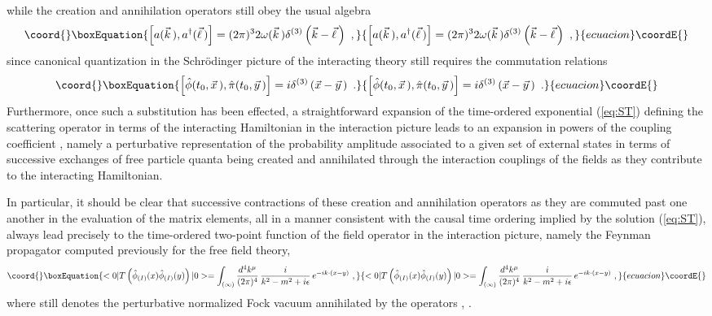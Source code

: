 \documentclass[a4paper,11pt]{article}
\begin{document}
while the creation and annihilation operators still obey the usual
algebra
\begin{equation}\coord{}\boxEquation{
\left[a(\vec{k}\,),a^\dagger(\vec{\ell}\,)\right]=(2\pi)^32\omega(\vec{k}\,)
\delta^{(3)}\left(\vec{k}-\vec{\ell}\,\right)\ ,
}{
\left[a(\vec{k}\,),a^\dagger(\vec{\ell}\,)\right]=(2\pi)^32\omega(\vec{k}\,)
\delta^{(3)}\left(\vec{k}-\vec{\ell}\,\right)\ ,
}{ecuacion}\coordE{}\end{equation}
since canonical quantization in the Schr\"odinger picture of the interacting
theory still requires the commutation relations
\begin{equation}\coord{}\boxEquation{
\left[\hat{\phi}(t_0,\vec{x}\,),\hat{\pi}(t_0,\vec{y}\,)\right]=
i\delta^{(3)}\left(\vec{x}-\vec{y}\,\right)\ .
}{
\left[\hat{\phi}(t_0,\vec{x}\,),\hat{\pi}(t_0,\vec{y}\,)\right]=
i\delta^{(3)}\left(\vec{x}-\vec{y}\,\right)\ .
}{ecuacion}\coordE{}\end{equation}
Furthermore, once such a substitution has been effected, a straightforward
expansion of the time-ordered exponential (\ref{eq:ST}) defining the 
scattering ope\-ra\-tor in terms of the interacting Hamiltonian in the 
interaction picture leads to an expansion in powers of the coupling 
coefficient \myHighlight{$\lambda$}\coordHE{}, namely a perturbative representation of the 
probability amplitude associated to a given set of external states in terms 
of successive exchanges of free particle quanta being created and 
annihilated through the interaction couplings of the fields as they contribute 
to the interacting Hamiltonian.

In particular, it should be clear that successive contractions of these
creation and annihilation operators as they are commuted past one another
in the evaluation of the matrix elements, all in a manner consistent with 
the causal time ordering implied by the solution (\ref{eq:ST}), always lead 
precisely to the time-ordered two-point function of the field operator in the
interaction picture, namely the Feynman propagator computed previously
for the free field theory,
\begin{equation}\coord{}\boxEquation{
<0|T\left(\hat{\phi}_{(I)}(x)\hat{\phi}_{(I)}(y)\right)|0>=
\int_{(\infty)}\frac{d^4k^\mu}{(2\pi)^4}\,\frac{i}{k^2-m^2+i\epsilon}\,
e^{-ik\cdot(x-y)}\ ,
}{
<0|T\left(\hat{\phi}_{(I)}(x)\hat{\phi}_{(I)}(y)\right)|0>=
\int_{(\infty)}\frac{d^4k^\mu}{(2\pi)^4}\,\frac{i}{k^2-m^2+i\epsilon}\,
e^{-ik\cdot(x-y)}\ ,
}{ecuacion}\coordE{}\end{equation}
where \coordHE{} still denotes the perturbative normalized Fock vacuum annihilated 
by the operators \coordHE{}, \coordHE{}.
\end{document}
